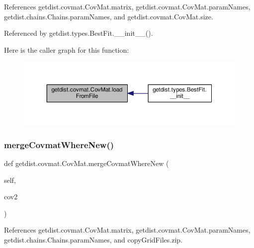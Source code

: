 References getdist.\+covmat.\+Cov\+Mat.\+matrix, getdist.\+covmat.\+Cov\+Mat.\+param\+Names, getdist.\+chains.\+Chains.\+param\+Names, and getdist.\+covmat.\+Cov\+Mat.\+size.



Referenced by getdist.\+types.\+Best\+Fit.\+\_\+\+\_\+init\+\_\+\+\_\+().

Here is the caller graph for this function\+:
\nopagebreak
\begin{figure}[H]
\begin{center}
\leavevmode
\includegraphics[width=350pt]{classgetdist_1_1covmat_1_1CovMat_abfc622cd1affb70314b55774500ef495_icgraph}
\end{center}
\end{figure}
\mbox{\label{classgetdist_1_1covmat_1_1CovMat_ad2a276c4ce0e9aa059c9cb34790987e4}} 
\subsubsection{\texorpdfstring{merge\+Covmat\+Where\+New()}{mergeCovmatWhereNew()}}
{\footnotesize\ttfamily def getdist.\+covmat.\+Cov\+Mat.\+merge\+Covmat\+Where\+New (\begin{DoxyParamCaption}\item[{}]{self,  }\item[{}]{cov2 }\end{DoxyParamCaption})}



References getdist.\+covmat.\+Cov\+Mat.\+matrix, getdist.\+covmat.\+Cov\+Mat.\+param\+Names, getdist.\+chains.\+Chains.\+param\+Names, and copy\+Grid\+Files.\+zip.

\mbox{\label{classgetdist_1_1covmat_1_1CovMat_a4565752dad2a96822320edb84eda5c09}} 
